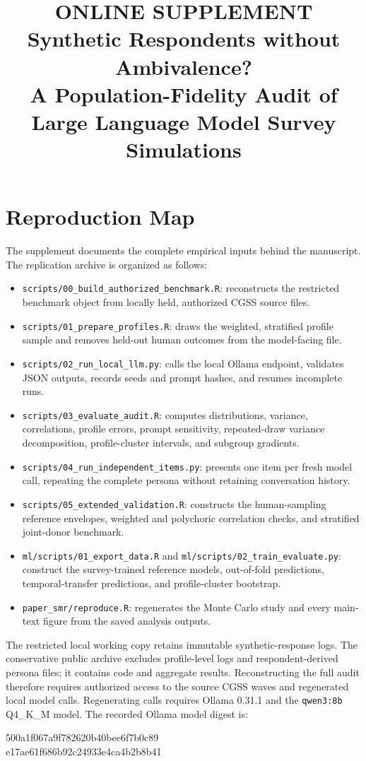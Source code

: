 \documentclass[11pt]{article}
\title{\textbf{ONLINE SUPPLEMENT}\\[0.5em]
Synthetic Respondents without Ambivalence?\\
A Population-Fidelity Audit of Large Language Model Survey Simulations}
\author{}
\date{}
\begin{document}
\maketitle

\section{Reproduction Map}

\begingroup
\sloppy
The supplement documents the complete empirical inputs behind the manuscript. The replication
archive is organized as follows:

\begin{itemize}
  \item \texttt{scripts/00\_build\_authorized\_benchmark.R}: reconstructs the restricted benchmark
  object from locally held, authorized CGSS source files.
  \item \texttt{scripts/01\_prepare\_profiles.R}: draws the weighted, stratified profile sample and
  removes held-out human outcomes from the model-facing file.
  \item \texttt{scripts/02\_run\_local\_llm.py}: calls the local Ollama endpoint, validates JSON
  outputs, records seeds and prompt hashes, and resumes incomplete runs.
  \item \texttt{scripts/03\_evaluate\_audit.R}: computes distributions, variance, correlations,
  profile errors, prompt sensitivity, repeated-draw variance decomposition, profile-cluster
  intervals, and subgroup gradients.
  \item \texttt{scripts/04\_run\_independent\_items.py}: presents one item per fresh model call,
  repeating the complete persona without retaining conversation history.
  \item \texttt{scripts/05\_extended\_validation.R}: constructs the human-sampling reference
  envelopes, weighted and polychoric correlation checks, and stratified joint-donor benchmark.
  \item \texttt{ml/scripts/01\_export\_data.R} and
  \texttt{ml/scripts/02\_train\_evaluate.py}: construct the survey-trained reference models,
  out-of-fold predictions, temporal-transfer predictions, and profile-cluster bootstrap.
  \item \texttt{paper\_smr/reproduce.R}: regenerates the Monte Carlo study and every main-text
  figure from the saved analysis outputs.
\end{itemize}

The restricted local working copy retains immutable synthetic-response logs. The conservative
public archive excludes profile-level logs and respondent-derived persona files; it contains code
and aggregate results. Reconstructing the full audit therefore requires authorized access to the
source CGSS waves and regenerated local model calls. Regenerating calls requires Ollama 0.31.1 and the
\texttt{qwen3:8b} Q4\_K\_M model. The recorded Ollama model digest is:
\begin{center}
\footnotesize\ttfamily
500a1f067a9f782620b40bee6f7b0c89\\
e17ae61f686b92c24933e4ca4b2b8b41
\end{center}
\endgroup
\end{document}
